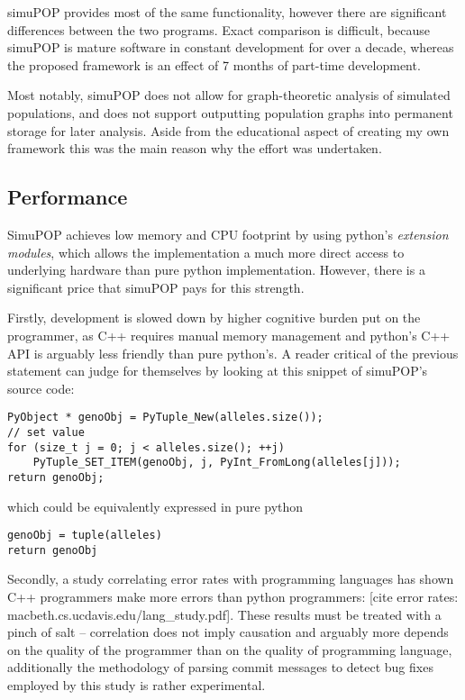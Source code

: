 \documentclass{l4proj}
\begin{document}
simuPOP provides most of the same functionality, however there are significant differences between the two programs. Exact comparison is difficult, because simuPOP is mature software in constant development for over a decade, whereas the proposed framework is an effect of 7 months of part-time development.

Most notably, simuPOP does not allow for graph-theoretic analysis of simulated populations, and does not support outputting population graphs into permanent storage for later analysis. Aside from the educational aspect of creating my own framework this was the main reason why the effort was undertaken.

\subsection{Performance}

SimuPOP achieves low memory and CPU footprint by using python's \textit{extension modules}, which allows the implementation a much more direct access to underlying hardware than pure python implementation. However, there is a significant price that simuPOP pays for this strength.

Firstly, development is slowed down by higher cognitive burden put on the programmer, as C++ requires manual memory management and python's C++ API is arguably less friendly than pure python's. A reader critical of the previous statement can judge for themselves by looking at this snippet of simuPOP's source code:

\begin{lstlisting}
PyObject * genoObj = PyTuple_New(alleles.size());
// set value
for (size_t j = 0; j < alleles.size(); ++j)
    PyTuple_SET_ITEM(genoObj, j, PyInt_FromLong(alleles[j]));
return genoObj;
\end{lstlisting}

which could be equivalently expressed in pure python 

\begin{lstlisting}
genoObj = tuple(alleles)
return genoObj    
\end{lstlisting}

Secondly, a study correlating error rates with programming languages has shown C++ programmers make more errors than python programmers: [cite error rates: macbeth.cs.ucdavis.edu/lang\_study.pdf]. These results must be treated with a pinch of salt -- correlation does not imply causation and arguably more depends on the quality of the programmer than on the quality of programming language, additionally the methodology of parsing commit messages to detect bug fixes employed by this study is rather experimental.
\end{document}
